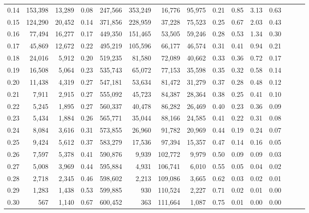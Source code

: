 \begin{tabular}{rrrrrrrrrrrrrrr}
0.14 &  153,398 &  13,289 &  0.08 &  247,566 &  353,249 &   16,776 &   95,975 &  0.21 &  0.85 &  3.13 &      0.63 \\
0.15 &  124,290 &  20,452 &  0.14 &  371,856 &  228,959 &   37,228 &   75,523 &  0.25 &  0.67 &  2.03 &      0.43 \\
0.16 &   77,494 &  16,277 &  0.17 &  449,350 &  151,465 &   53,505 &   59,246 &  0.28 &  0.53 &  1.34 &      0.30 \\
0.17 &   45,869 &  12,672 &  0.22 &  495,219 &  105,596 &   66,177 &   46,574 &  0.31 &  0.41 &  0.94 &      0.21 \\
0.18 &   24,016 &   5,912 &  0.20 &  519,235 &   81,580 &   72,089 &   40,662 &  0.33 &  0.36 &  0.72 &      0.17 \\
0.19 &   16,508 &   5,064 &  0.23 &  535,743 &   65,072 &   77,153 &   35,598 &  0.35 &  0.32 &  0.58 &      0.14 \\
0.20 &   11,438 &   4,319 &  0.27 &  547,181 &   53,634 &   81,472 &   31,279 &  0.37 &  0.28 &  0.48 &      0.12 \\
0.21 &    7,911 &   2,915 &  0.27 &  555,092 &   45,723 &   84,387 &   28,364 &  0.38 &  0.25 &  0.41 &      0.10 \\
0.22 &    5,245 &   1,895 &  0.27 &  560,337 &   40,478 &   86,282 &   26,469 &  0.40 &  0.23 &  0.36 &      0.09 \\
0.23 &    5,434 &   1,884 &  0.26 &  565,771 &   35,044 &   88,166 &   24,585 &  0.41 &  0.22 &  0.31 &      0.08 \\
0.24 &    8,084 &   3,616 &  0.31 &  573,855 &   26,960 &   91,782 &   20,969 &  0.44 &  0.19 &  0.24 &      0.07 \\
0.25 &    9,424 &   5,612 &  0.37 &  583,279 &   17,536 &   97,394 &   15,357 &  0.47 &  0.14 &  0.16 &      0.05 \\
0.26 &    7,597 &   5,378 &  0.41 &  590,876 &    9,939 &  102,772 &    9,979 &  0.50 &  0.09 &  0.09 &      0.03 \\
0.27 &    5,008 &   3,969 &  0.44 &  595,884 &    4,931 &  106,741 &    6,010 &  0.55 &  0.05 &  0.04 &      0.02 \\
0.28 &    2,718 &   2,345 &  0.46 &  598,602 &    2,213 &  109,086 &    3,665 &  0.62 &  0.03 &  0.02 &      0.01 \\
0.29 &    1,283 &   1,438 &  0.53 &  599,885 &      930 &  110,524 &    2,227 &  0.71 &  0.02 &  0.01 &      0.00 \\
0.30 &      567 &   1,140 &  0.67 &  600,452 &      363 &  111,664 &    1,087 &  0.75 &  0.01 &  0.00 &      0.00 \\

\end{tabular}
